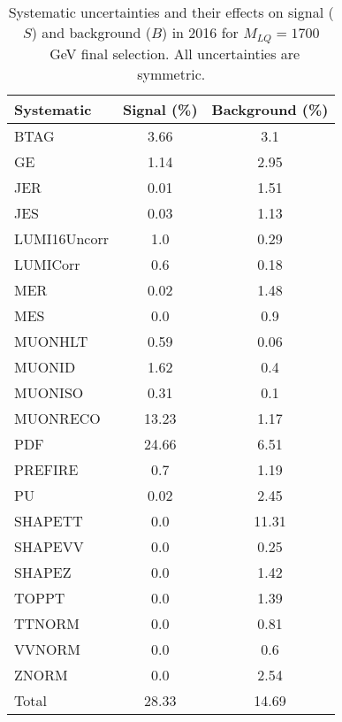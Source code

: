 \begin{table}[htbp]
\begin{center}
\caption{Systematic uncertainties and their effects on signal ($S$) and background ($B$) in 2016 for $M_{LQ}=1700$~GeV final selection. All uncertainties are symmetric.}
\begin{tabular}{lcc}
\hline\hline
Systematic & Signal (\%) & Background (\%) \\ \hline 
BTAG & 3.66 & 3.1\\ 
GE & 1.14 & 2.95\\ 
JER & 0.01 & 1.51\\ 
JES & 0.03 & 1.13\\ 
LUMI16Uncorr & 1.0 & 0.29\\ 
LUMICorr & 0.6 & 0.18\\ 
MER & 0.02 & 1.48\\ 
MES & 0.0 & 0.9\\ 
MUONHLT & 0.59 & 0.06\\ 
MUONID & 1.62 & 0.4\\ 
MUONISO & 0.31 & 0.1\\ 
MUONRECO & 13.23 & 1.17\\ 
PDF & 24.66 & 6.51\\ 
PREFIRE & 0.7 & 1.19\\ 
PU & 0.02 & 2.45\\ 
SHAPETT & 0.0 & 11.31\\ 
SHAPEVV & 0.0 & 0.25\\ 
SHAPEZ & 0.0 & 1.42\\ 
TOPPT & 0.0 & 1.39\\ 
TTNORM & 0.0 & 0.81\\ 
VVNORM & 0.0 & 0.6\\ 
ZNORM & 0.0 & 2.54\\ 
Total & 28.33 & 14.69\\ \hline \hline
\end{tabular}
\label{tab:SysUncertainties_uujj_1700}
\end{center}
\end{table}

